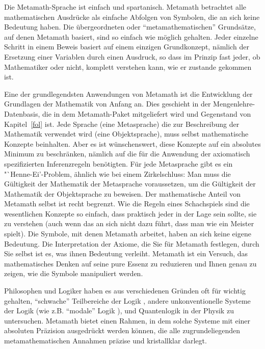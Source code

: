 Die Metamath-Sprache ist einfach und spartanisch.  Metamath betrachtet alle mathematischen Ausdrücke als einfache Abfolgen von Symbolen, die an sich keine Bedeutung haben.
Die übergeordneten oder "`metamathematischen"' Grundsätze, auf denen Metamath basiert, sind so einfach wie möglich gehalten.  Jeder einzelne Schritt in einem Beweis basiert auf einem einzigen Grundkonzept, nämlich der Ersetzung einer Variablen durch einen Ausdruck, so dass im Prinzip fast jeder, ob Mathematiker oder nicht, komplett verstehen kann, wie er zustande gekommen ist.

Eine der grundlegendsten Anwendungen von Metamath ist die Entwicklung der Grundlagen der Mathematik von Anfang an.  Dies geschieht in der Mengenlehre-Datenbasis, die in dem  Metamath-Paket mitgeliefert wird und Gegenstand von Kapitel~\ref{fol} ist. Jede Sprache (eine Metasprache) die zur Beschreibung der Mathematik verwendet wird (eine Objektsprache), muss selbst mathematische Konzepte beinhalten.  Aber es ist wünschenswert, diese Konzepte auf ein absolutes Minimum zu beschränken, nämlich auf die für die Anwendung der axiomatisch spezifizierten Inferenzregeln benötigten.  Für jede Metasprache gibt es ein "`Henne-Ei'-Problem, ähnlich wie bei einem Zirkelschluss: Man muss die Gültigkeit der Mathematik der Metasprache voraussetzen, um die Gültigkeit der Mathematik der Objektsprache zu beweisen.  Der mathematische Anteil von Metamath selbst ist recht begrenzt.  Wie die Regeln eines Schachspiels sind die  wesentlichen Konzepte so einfach, dass praktisch jeder in der Lage sein sollte, sie zu verstehen (auch wenn das an sich nicht dazu führt, dass man wie ein Meister spielt).  Die Symbole, mit denen Metamath arbeitet, haben an sich keine eigene Bedeutung.  Die Interpretation der Axiome, die Sie für Metamath festlegen, durch Sie selbst ist es, was ihnen Bedeutung verleiht.  Metamath ist ein Versuch, das mathematisches Denken auf seine pure Essenz zu reduzieren und Ihnen genau zu zeigen, wie die Symbole manipuliert werden.

Philosophen und Logiker haben es aus verschiedenen Gründen oft für wichtig gehalten, "`schwache"' Teilbereiche der Logik\cite{Anderson} \cite{MegillBunder}, andere unkonventionelle Systeme der Logik (wie z.B. "`modale"' Logik \cite[Kap.\ 27]{Boolos}), und Quantenlogik in der Physik\cite{Pavicic} zu untersuchen.  Metamath bietet einen Rahmen, in dem solche Systeme mit einer absoluten Präzision ausgedrückt werden können, die alle zugrundeliegenden metamathematischen Annahmen präzise und kristallklar darlegt.

